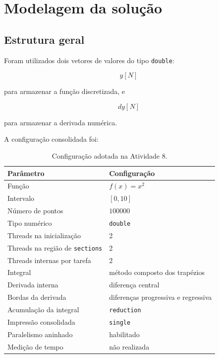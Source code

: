 \section{Modelagem da solução}
\label{sec:atvd08-modelagem}

\subsection{Estrutura geral}

Foram utilizados dois vetores de valores do tipo \texttt{double}:

\[
y[N]
\]

para armazenar a função discretizada, e

\[
dy[N]
\]

para armazenar a derivada numérica.

A configuração consolidada foi:

\begin{table}[htbp]
    \centering
    \caption{Configuração adotada na Atividade 8.}
    \label{tab:atvd08-configuracao}
    \begin{tabular}{|p{}|p{}|}
        \hline
        \textbf{Parâmetro} & \textbf{Configuração} \\
        \hline
        Função & $f(x)=x^2$ \\
        \hline
        Intervalo & $[0,10]$ \\
        \hline
        Número de pontos & $100000$ \\
        \hline
        Tipo numérico & \texttt{double} \\
        \hline
        Threads na inicialização & 2 \\
        \hline
        Threads na região de \texttt{sections} & 2 \\
        \hline
        Threads internas por tarefa & 2 \\
        \hline
        Integral & método composto dos trapézios \\
        \hline
        Derivada interna & diferença central \\
        \hline
        Bordas da derivada & diferenças progressiva e regressiva \\
        \hline
        Acumulação da integral & \texttt{reduction} \\
        \hline
        Impressão consolidada & \texttt{single} \\
        \hline
        Paralelismo aninhado & habilitado \\
        \hline
        Medição de tempo & não realizada \\
        \hline
    \end{tabular}
\end{table}


